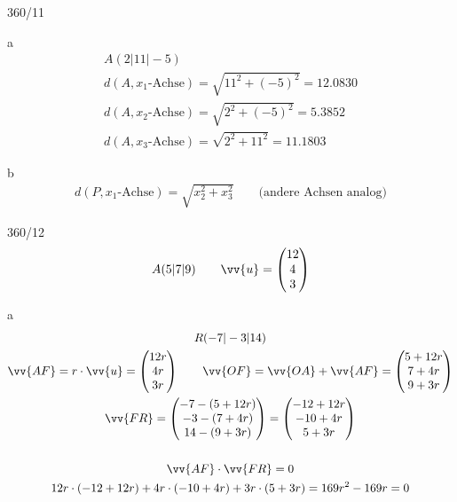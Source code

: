 \begin{exercise}{360/11}
  \item [a]
  \begin{gather*}
    A(2|11|-5) \\
    d(A, x_1\text{-Achse}) = \sqrt{11^2 + (-5)^2} = 12.0830 \\
    d(A, x_2\text{-Achse}) = \sqrt{2^2 + (-5)^2} = 5.3852 \\
    d(A, x_3\text{-Achse}) = \sqrt{2^2 + 11^2} = 11.1803
  \end{gather*}
  \item [b]
  \begin{gather*}
    d(P, x_1\text{-Achse}) = \sqrt{x_2^2 + x_3^2} \qquad \text{(andere Achsen analog)}
  \end{gather*}
\end{exercise}
\begin{exercise}{360/12}
  \begin{gather*}
    A(5|7|9) \qquad \vv{u} = \begin{pmatrix}12 \\ 4 \\ 3\end{pmatrix}
  \end{gather*}
  \item [a]
  \begin{gather*}
    R(-7|-3|14) \\
    \vv{AF} = r \cdot \vv{u} = \begin{pmatrix}12r \\ 4r \\ 3r\end{pmatrix} \qquad \vv{OF} = \vv{OA} + \vv{AF} = \begin{pmatrix}5 + 12r \\ 7 + 4r \\ 9 + 3r\end{pmatrix} \\
    \vv{FR} = \begin{pmatrix}-7 - (5 + 12r) \\ -3 - (7 + 4r) \\ 14 - (9 + 3r)\end{pmatrix} = \begin{pmatrix}-12 + 12r \\ -10 + 4r \\ 5 + 3r\end{pmatrix} \\\\
    \vv{AF} \cdot \vv{FR} = 0 \\
    12r \cdot (-12 + 12r) + 4r \cdot (-10 + 4r) + 3r \cdot (5 + 3r) = 169r^2 - 169r = 0 \\

\end{gather*}
\end{exercise}
